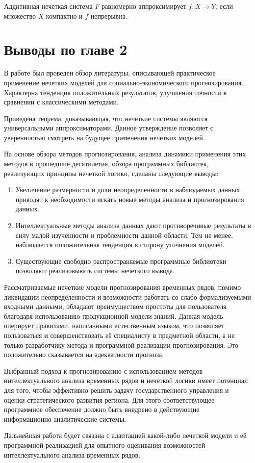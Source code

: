\begin{theorem}
	\label{theorem:FAT}
	Аддитивная нечеткая система  $F$ равномерно аппроксимирует $f: X\rightarrow Y$, если множество $X$ компактно и $f$ непрерывна.
\end{theorem}

\newpage
\section*{Выводы по главе 2}

В работе был проведен обзор литературы, описывающей практическое применение нечетких моделей для социально-экономического прогнозирования. Характерна тенденция положительных результатов, улучшения точности в сравнении с классическими методами.

Приведена теорема, доказывающая, что нечеткие системы являются универсальными аппроксиматорами. Данное утверждение позволяет с уверенностью смотреть на будущее применения нечетких моделей.

На основе обзора методов прогнозирования, анализа динамики применения этих методов в прошедшие десятилетия, 
обзора программных библиотек, реализующих принципы нечеткой логики, сделаны следующие выводы:
\begin{enumerate}
    \item Увеличение размерности и доли неопределенности в наблюдаемых данных приводят к необходимости искать новые методы анализа и прогнозирования данных.
    \item Интеллектуальные методы анализа данных дают противоречивые результаты в силу малой изученности и проблемности данной области. Тем не менее, наблюдается положительная тенденция в сторону уточнения моделей.
    \item Существующие свободно распространяемые программные библиотеки позволяют реализовывать системы нечеткого вывода. 
\end{enumerate}

Рассматриваемые нечеткие модели прогнозирования временных рядов, помимо ликвидации неопределенности и возможности работать со слабо формализуемыми входными данными, 
обладают преимуществом простоты для пользователя благодаря использованию продукционной модели знаний. 
Данная модель оперирует правилами, написанными естественным языком, что позволяет пользоваться и совершенствовать её специалисту в предметной области, 
а не только разработчику метода и программной реализации прогнозирования. 
Это положительно сказывается на адекватности прогноза.

Выбранный подход к прогнозированию с использованием методов интеллектуального анализа временных рядов и нечеткой логики имеет потенциал для того, 
чтобы эффективно решить задачу государственного управления и оценки стратегического развития региона. 
Для этого соответствующее программное обеспечение должно быть внедрено в действующие информационно-аналитические системы. 

Дальнейшая работа будет связана с адаптацией какой-либо нечеткой модели 
и её программной реализацией для опытного оценивания возможностей интеллектуального анализа временных рядов.


